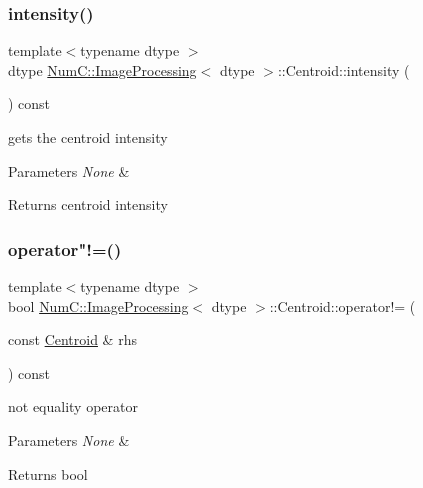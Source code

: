 \subsubsection{\texorpdfstring{intensity()}{intensity()}}
{\footnotesize\ttfamily template$<$typename dtype $>$ \\
dtype \mbox{\hyperlink{class_num_c_1_1_image_processing}{Num\+C\+::\+Image\+Processing}}$<$ dtype $>$\+::Centroid\+::intensity (\begin{DoxyParamCaption}{ }\end{DoxyParamCaption}) const\hspace{0.3cm}{\ttfamily [inline]}}

gets the centroid intensity


\begin{DoxyParams}{Parameters}
{\em None} & \\
\hline
\end{DoxyParams}
\begin{DoxyReturn}{Returns}
centroid intensity 
\end{DoxyReturn}
\mbox{\label{class_num_c_1_1_image_processing_1_1_centroid_a19e5b0811bd2e1b6b37f5789a67c2ed7}} 
\subsubsection{\texorpdfstring{operator"!=()}{operator!=()}}
{\footnotesize\ttfamily template$<$typename dtype $>$ \\
bool \mbox{\hyperlink{class_num_c_1_1_image_processing}{Num\+C\+::\+Image\+Processing}}$<$ dtype $>$\+::Centroid\+::operator!= (\begin{DoxyParamCaption}\item[{const \mbox{\hyperlink{class_num_c_1_1_image_processing_1_1_centroid}{Centroid}} \&}]{rhs }\end{DoxyParamCaption}) const\hspace{0.3cm}{\ttfamily [inline]}}

not equality operator


\begin{DoxyParams}{Parameters}
{\em None} & \\
\hline
\end{DoxyParams}
\begin{DoxyReturn}{Returns}
bool 
\end{DoxyReturn}
\mbox{\label{class_num_c_1_1_image_processing_1_1_centroid_a89a4091604f093a891a1b8bf9619bad2}} 
